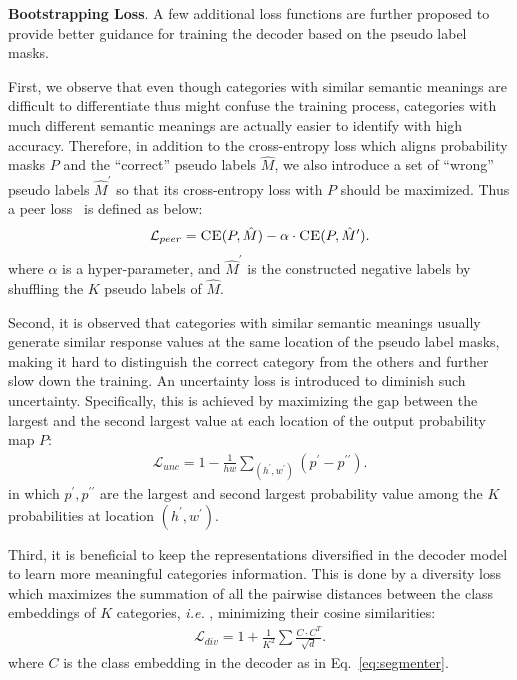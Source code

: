 \documentclass[runningheads]{llncs}
\def\ie{\emph{i.e. }}
\newcommand{\PAR}[1]{\smallskip \noindent \textbf{#1}}
\begin{document}
\PAR{Bootstrapping Loss}. A few additional loss functions are further proposed to provide better guidance for training the decoder based on the pseudo label masks. 

First, we observe that even though categories with similar semantic meanings are difficult to differentiate thus might confuse the training process, categories with much different semantic meanings are actually easier to identify with high accuracy. Therefore, in addition to the cross-entropy loss which aligns probability masks $P$ and the ``correct'' pseudo labels $\hat{M}$, we also introduce a set of ``wrong'' pseudo labels $\hat{M}^{\prime}$ so that its cross-entropy loss with $P$ should be maximized. Thus a peer loss~\cite{liu2020PeerLoss} is defined as below:
\begin{align}
    \mathcal{L}_{peer} = \Call{CE}{P, \hat{M}} - \alpha \cdot \Call{CE}{P, \hat{M}^{\prime}}.
    \label{eq:loss:peer}
\end{align}
where $\alpha$ is a hyper-parameter, and $\hat{M}^{\prime}$ is the constructed negative labels by shuffling the $K$ pseudo labels of $\hat{M}$.

Second, it is observed that categories with similar semantic meanings usually generate similar response values at the same location of the pseudo label masks, making it hard to distinguish the correct category from the others and further slow down the training.  An uncertainty loss is introduced to diminish such uncertainty. Specifically, this is achieved by maximizing the gap between the largest and the second largest value at each location of the output probability map $P$:
\begin{align}
    \mathcal{L}_{unc} = 1 - \frac{1}{hw} \sum_{(h^{\prime}, w^{\prime})}(p^{\prime} - p^{\prime\prime}).
    \label{eq:loss:unc}
\end{align}
in which $p^{\prime}, p^{\prime\prime}$ are the largest and second largest probability value among the $K$ probabilities at location $(h^{\prime}, w^{\prime})$. 

Third, it is beneficial to keep the representations diversified in the decoder model to learn more meaningful categories information. This is done by a diversity loss which maximizes the summation of all the pairwise distances between the class embeddings of $K$ categories, \ie, minimizing their cosine similarities: 
\begin{align}
    \mathcal{L}_{div} = 1 + \frac{1}{K^2}\sum\frac{C \cdot C^T}{\sqrt{d}}.
    \label{eq:loss:div}
\end{align}
where $C$ is the class embedding in the decoder as in Eq.~\ref{eq:segmenter}.
\end{document}
